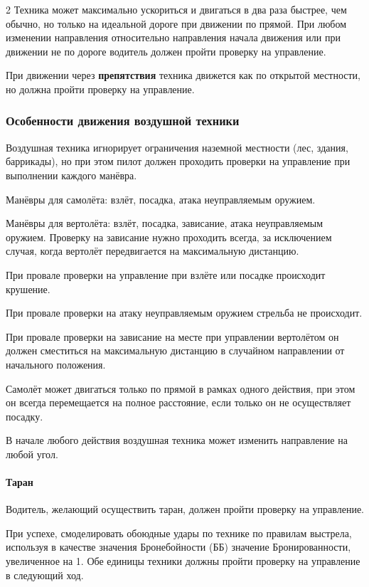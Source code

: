 \documentclass[twoside]{article}
\begin{document}
\begin{multicols}{2}
Техника может максимально ускориться и двигаться в два раза быстрее, чем
обычно, но только на идеальной дороге при движении по прямой. При любом
изменении направления относительно направления начала движения или при
движении не по дороге водитель должен пройти проверку на управление.

При движении через \textbf{препятствия} техника движется как по открытой
местности, но должна пройти проверку на управление.

\subsubsection{Особенности движения воздушной техники}\label{air-vehicle-movement}

Воздушная техника игнорирует ограничения наземной местности (лес,
здания, баррикады), но при этом пилот должен проходить проверки на
управление при выполнении каждого манёвра.

Манёвры для самолёта: взлёт, посадка, атака неуправляемым оружием.

Манёвры для вертолёта: взлёт, посадка, зависание, атака неуправляемым оружием. Проверку на зависание нужно проходить всегда,
за исключением случая, когда вертолёт передвигается на максимальную дистанцию.

При провале проверки на управление при взлёте или посадке происходит крушение.

При провале проверки на атаку неуправляемым оружием стрельба не происходит.

При провале проверки на зависание на месте при управлении вертолётом он должен сместиться на максимальную дистанцию
в случайном направлении от начального положения.

Самолёт может двигаться только по прямой в рамках одного действия, при этом он всегда перемещается на полное расстояние,
если только он не осуществляет посадку.

В начале любого действия воздушная техника может изменить направление на любой угол.

\paragraph{Таран}\label{ramming}

Водитель, желающий осуществить таран, должен пройти проверку на управление.

При успехе, смоделировать обоюдные удары по технике по правилам выстрела,
используя в качестве значения Бронебойности (ББ) значение Бронированности, увеличенное на 1.
Обе единицы техники должны пройти проверку на управление в следующий ход.


\end{multicols}
\end{document}

